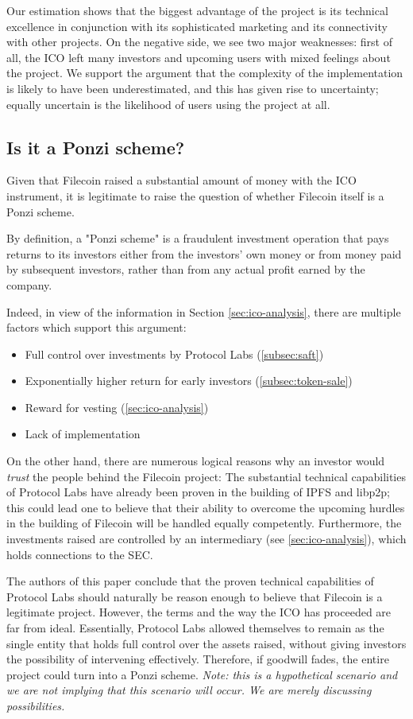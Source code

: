 \documentclass[conference]{IEEEtran}
\begin{document}
Our estimation shows that the biggest advantage of the project is its technical excellence in conjunction with its sophisticated marketing and its connectivity with other projects.
On the negative side, we see two major weaknesses:
first of all, the ICO left many investors and upcoming users with mixed feelings about the project.
We support the argument that the complexity of the implementation is likely to have been underestimated, and this has given rise to uncertainty; equally uncertain is the likelihood of users using the project at all.

\subsection{Is it a Ponzi scheme?}
Given that Filecoin raised a substantial amount of money with the ICO instrument, it is legitimate to raise the question of whether Filecoin itself is a Ponzi scheme.

By definition, a "Ponzi scheme" is a fraudulent investment operation that pays returns to its investors either from the investors' own money or from money paid by subsequent investors, rather than from any actual profit earned by the company. \cite{ponzi}

Indeed, in view of the information in Section \ref{sec:ico-analysis}, there are multiple factors which support this argument:
\begin{itemize}
\item Full control over investments by Protocol Labs (\ref{subsec:saft})
\item Exponentially higher return for early investors (\ref{subsec:token-sale})
\item Reward for vesting (\ref{sec:ico-analysis})
\item Lack of implementation
\end{itemize}

On the other hand, there are numerous logical reasons why an investor would \textit{trust} the people behind the Filecoin project:
The substantial technical capabilities of Protocol Labs have already been proven in the building of IPFS and libp2p; this could lead one to believe that their ability to overcome the upcoming hurdles in the building of Filecoin will be handled equally competently.
Furthermore, the investments raised are controlled by an intermediary (see \ref{sec:ico-analysis}), which holds connections to the SEC. 

The authors of this paper conclude that the proven technical capabilities of Protocol Labs should naturally be reason enough to believe that Filecoin is a legitimate project.
However, the terms and the way the ICO has proceeded are far from ideal.
Essentially, Protocol Labs allowed themselves to remain as the single entity that holds full control over the assets raised, without giving investors the possibility of intervening effectively.
Therefore, if goodwill fades, the entire project could turn into a Ponzi scheme.
\textit{Note: this is a hypothetical scenario and we are not implying that this scenario will occur. We are merely discussing possibilities.}
\end{document}
